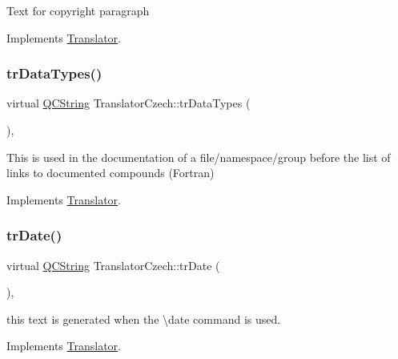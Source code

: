 Text for copyright paragraph 

Implements \mbox{\hyperlink{class_translator}{Translator}}.

\mbox{\label{class_translator_czech_a63842f9d8539583c1e5ed3b1f45ab6b7}} 
\subsubsection{\texorpdfstring{trDataTypes()}{trDataTypes()}}
{\footnotesize\ttfamily virtual \mbox{\hyperlink{class_q_c_string}{Q\+C\+String}} Translator\+Czech\+::tr\+Data\+Types (\begin{DoxyParamCaption}{ }\end{DoxyParamCaption})\hspace{0.3cm}{\ttfamily [inline]}, {\ttfamily [virtual]}}

This is used in the documentation of a file/namespace/group before the list of links to documented compounds (Fortran) 

Implements \mbox{\hyperlink{class_translator}{Translator}}.

\mbox{\label{class_translator_czech_a0512e60a882d67968560aea51b769a2b}} 
\subsubsection{\texorpdfstring{trDate()}{trDate()}}
{\footnotesize\ttfamily virtual \mbox{\hyperlink{class_q_c_string}{Q\+C\+String}} Translator\+Czech\+::tr\+Date (\begin{DoxyParamCaption}{ }\end{DoxyParamCaption})\hspace{0.3cm}{\ttfamily [inline]}, {\ttfamily [virtual]}}

this text is generated when the \textbackslash{}date command is used. 

Implements \mbox{\hyperlink{class_translator}{Translator}}.

\mbox{\label{class_translator_czech_a48e59377a035fcd38d3a0df78f0f98f4}} 
